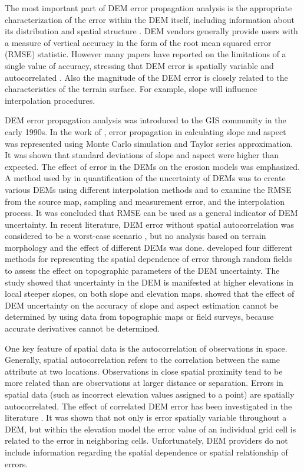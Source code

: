 \documentclass{article}
\begin{document}
The most important part of DEM error propagation analysis is the
appropriate characterization of the error within the DEM itself,
including information about its distribution and spatial structure
\citep{Shortridge2001}.  DEM vendors generally provide users with a
measure of vertical accuracy in the form of the root mean squared
error (RMSE) statistic. However many papers have reported on the
limitations of a single value of accuracy, stressing that DEM error is
spatially variable and autocorrelated \citep{Wechsler2006,
  Amii_Darnell}. Also the magnitude of the DEM error is closely
related to the characteristics of the terrain surface. For example,
slope will influence interpolation procedures.


DEM error propagation analysis was introduced to the GIS community in
the early 1990s.  In the work of \citet{Heuvelink1990}, error
propagation in calculating slope and aspect was represented using
Monte Carlo simulation and Taylor series approximation. It was shown
that standard deviations of slope and aspect were higher than
expected.  The effect of error in the DEMs on the erosion models was
emphasized.  A method used by \citet{Qihao_Weng} in quantification of
the uncertainty of DEMs was to create various DEMs using different
interpolation methods and to examine the RMSE from the source map,
sampling and measurement error, and the interpolation process. It was
concluded that RMSE can be used as a general indicator of DEM
uncertainty.  In recent literature, DEM error without spatial
autocorrelation was considered to be a worst-case scenario
\citep{Heuvelink1989, VanNiel2004, Oksanen2006}, but no analysis based
on terrain morphology and the effect of different DEMs was done.
\citet{Wechsler2006} developed four different methods for representing
the spatial dependence of error through random fields to assess the
effect on topographic parameters of the DEM uncertainty. The study
showed that uncertainty in the DEM is manifested at higher elevations
in local steeper slopes, on both slope and elevation maps.
\citet{Florinsky1998} showed that the effect of DEM uncertainty on the
accuracy of slope and aspect estimation cannot be determined by using
data from topographic maps or field surveys, because accurate
derivatives cannot be determined.

One key feature of spatial data is the autocorrelation of observations
in space.  Generally, spatial autocorrelation refers to the
correlation between the same attribute at two locations. Observations
in close spatial proximity tend to be more related than are
observations at larger distance or separation. Errors in spatial data
(such as incorrect elevation values assigned to a point) are spatially
autocorrelated. The effect of correlated DEM error has been
investigated in the literature \citep{Fisher_1991, Goodchild_1992}. It
was shown that not only is error spatially variable throughout a DEM,
but within the elevation model the error value of an individual grid
cell is related to the error in neighboring cells. Unfortunately, DEM
providers do not include information regarding the spatial dependence
or spatial relationship of errors.
\end{document}
